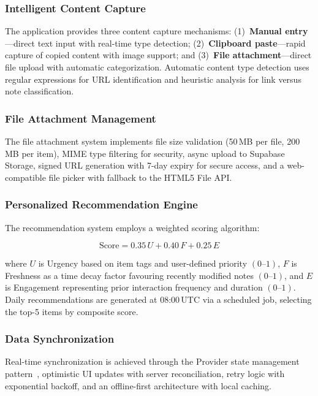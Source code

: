 \documentclass[10pt,twocolumn,a4paper]{article}
\begin{document}
\subsubsection{Intelligent Content Capture}
The application provides three content capture mechanisms: (1)~\textbf{Manual entry}---direct
text input with real-time type detection; (2)~\textbf{Clipboard paste}---rapid capture of
copied content with image support; and (3)~\textbf{File attachment}---direct file upload with
automatic categorization. Automatic content type detection uses regular expressions for URL
identification and heuristic analysis for link versus note classification.

\subsubsection{File Attachment Management}
The file attachment system implements file size validation (50\,MB per file, 200\,MB per
item), MIME type filtering for security, async upload to Supabase Storage, signed URL
generation with 7-day expiry for secure access, and a web-compatible file picker with
fallback to the HTML5 File API.

\subsubsection{Personalized Recommendation Engine}
The recommendation system employs a weighted scoring algorithm:

\begin{equation}
  \text{Score} = 0.35\,U + 0.40\,F + 0.25\,E
  \label{eq:score}
\end{equation}

\noindent where $U$ is Urgency based on item tags and user-defined priority $(0\text{--}1)$,
$F$ is Freshness as a time decay factor favouring recently modified notes $(0\text{--}1)$, and
$E$ is Engagement representing prior interaction frequency and duration $(0\text{--}1)$.
Daily recommendations are generated at 08:00\,UTC via a scheduled job, selecting the top-5
items by composite score.

\subsubsection{Data Synchronization}
Real-time synchronization is achieved through the Provider state management
pattern~\cite{provider2023}, optimistic UI updates with server reconciliation, retry logic
with exponential backoff, and an offline-first architecture with local caching.
\end{document}
